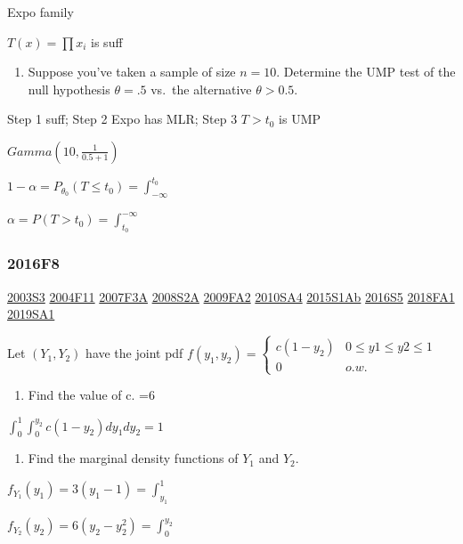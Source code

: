 \documentclass[10pt,twocolumn,portrait]{article}
\providecommand{\tightlist}{%
  \setlength{\itemsep}{0pt}\setlength{\parskip}{0pt}}
\begin{document}
Expo family

\(T(x)=\prod x_i\) is suff

\begin{enumerate}
\def\labelenumi{(\alph{enumi})}
\setcounter{enumi}{6}
\tightlist
\item
  Suppose you've taken a sample of size \(n=10\). Determine the UMP test
  of the null hypothesis \(\theta=.5\) vs.~the alternative
  \(\theta>0.5\).
\end{enumerate}

Step 1 suff; Step 2 Expo has MLR; Step 3 \(T>t_0\) is UMP

\(Gamma(10,\frac{1}{0.5+1})\)

\(1-\alpha=P_{\theta_0}(T\le t_0)=\int_{-\infty}^{t_0}\)

\(\alpha=P(T>t_0)=\int_{t_0}^{-\infty}\)

\hypertarget{f8-4}{%
\subsubsection{2016F8}\label{f8-4}}

\protect\hyperlink{s3}{2003S3} \protect\hyperlink{f11}{2004F11}
\protect\hyperlink{f3a}{2007F3A} \protect\hyperlink{s2a}{2008S2A}
\protect\hyperlink{fa2}{2009FA2} \protect\hyperlink{sa4-1}{2010SA4}
\protect\hyperlink{s1ab}{2015S1Ab} \protect\hyperlink{s5-4}{2016S5}
\protect\hyperlink{fa1-4}{2018FA1} \protect\hyperlink{sa1-3}{2019SA1}

Let \((Y_1,Y_2)\) have the joint pdf
\(f(y_1,y_2)=\begin{cases}c(1-y_2)&0\le y1\le y2\le 1\\0& o.w.\end{cases}\)

\begin{enumerate}
\def\labelenumi{(\alph{enumi})}
\tightlist
\item
  Find the value of c. =6
\end{enumerate}

\(\int_0^1\int_0^{y_2}c(1-y_2)dy_1dy_2=1\)

\begin{enumerate}
\def\labelenumi{(\alph{enumi})}
\setcounter{enumi}{1}
\tightlist
\item
  Find the marginal density functions of \(Y_1\) and \(Y_2\).
\end{enumerate}

\(f_{Y_1}(y_1)=3(y_1-1)=\int_{y_1}^1\)

\(f_{Y_2}(y_2)=6(y_2-y_2^2)=\int_0^{y_2}\)
\end{document}
